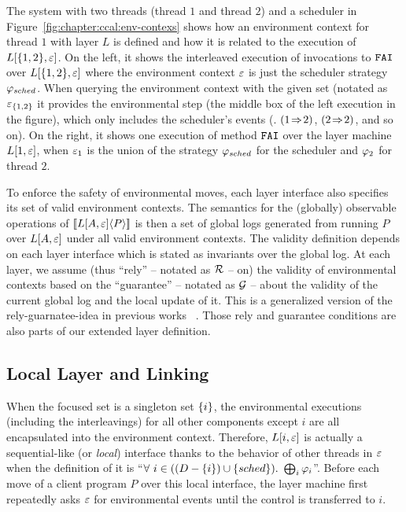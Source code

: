 The system with two threads
(thread $1$ and thread $2$) and a scheduler in Figure~\ref{fig:chapter:ccal:env-contexs}
shows how
an environment context for thread $1$  with layer $L$ is defined 
and how it is related to the execution of  $L[\{1,2\}, {\varepsilon}]$.
On the left, it shows the interleaved execution of
 invocations to ${\mathrm{\texttt{FAI}}}$ over $L[\{1, 2\}, {\varepsilon}]$
where the environment context ${\varepsilon}$ is just the scheduler
strategy $\varphi_{sched}$.
When querying the environment context with the given set (notated as ${\varepsilon}_{\{1, 2\}}$ 
it provides the environmental step (the middle box  of the left execution in the figure),
which only includes the scheduler's events (\eg . $(1 \!\Rightarrow\! 2)$, $(2 \!\Rightarrow\! 2)$, and so on).
On the right, it shows one execution
of method ${\mathrm{\texttt{FAI}}}$ over the layer machine $L[1, {\varepsilon}]$, when ${\varepsilon}_1$ is the union of
the strategy $\varphi_{sched}$ for the scheduler and $\varphi_{2}$ for
thread $2$. 

To enforce the safety of environmental moves,
each layer interface also specifies its set of valid environment contexts.
The semantics for the (globally) observable operations of $[\![{L[A, {\varepsilon}]} \langle {P} \rangle]\!]$ is then a set of global logs
generated from running $P$ over $L[A, {\varepsilon}]$ under all valid
environment contexts. 
The validity definition depends on each layer interface which is stated as invariants over the global log. 
At each layer, we assume (thus ``rely'' -- notated as $\mathcal{R}$ -- on) the validity of environmental contexts based on the ``guarantee'' -- notated as $\mathcal{G}$ -- about the validity of the current global log and the local update of it. 
This is a generalized version of the rely-guarnatee-idea in previous works ~\cite{feng07:sagl,vafeiadis:marriage,LRG,fu10:roch,sergey15}. 
Those rely and guarantee conditions
are also parts of our extended layer definition. 


\subsection{Local Layer and Linking}
\label{chapter:ccal:subsec:local-layer-with-environmental-context-and-local-layer-linking}
 
When the focused set is a singleton set $\{i\}$,
the environmental executions (including the interleavings) for all other components except $i$ are all encapsulated into the environment
context.
Therefore,  $L[i, {\varepsilon}]$ is actually a sequential-like (or \emph{local}) interface thanks to the behavior of other threads in ${\varepsilon}$ when
the definition of it is ``$\forall\ i \in ((D - \{i\}) \cup \{sched\}) .\ \bigoplus_{i} \varphi_{i}$''.
Before each move of a client program $P$ over this local interface, 
the layer machine first repeatedly asks ${\varepsilon}$ for environmental events until the control is transferred to $i$. 


